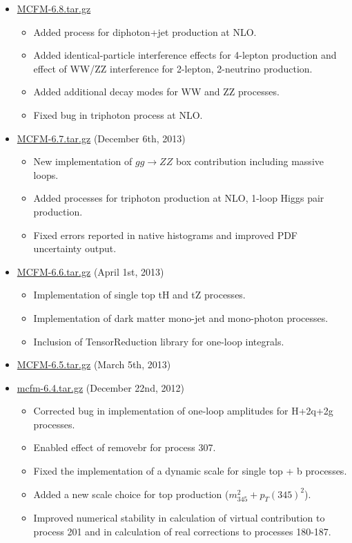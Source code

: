 \begin{itemize}
\item \href{https://mcfm.fnal.gov/downloads/MCFM-6.8.tar.gz}{MCFM-6.8.tar.gz}

\begin{itemize}
\item    Added process for diphoton+jet production at NLO.
\item    Added identical-particle interference effects for 4-lepton production and effect of WW/ZZ interference for 2-lepton, 2-neutrino production.
\item    Added additional decay modes for WW and ZZ processes.
\item    Fixed bug in triphoton process at NLO.
\end{itemize}

\item \href{https://mcfm.fnal.gov/downloads/MCFM-6.7.tar.gz}{MCFM-6.7.tar.gz} (December 6th, 2013)

\begin{itemize}
\item    New implementation of $gg \to ZZ$ box contribution including massive loops.
\item    Added processes for triphoton production at NLO, 1-loop Higgs pair production.
\item    Fixed errors reported in native histograms and improved PDF uncertainty output. 
\end{itemize}

\item \href{https://mcfm.fnal.gov/downloads/MCFM-6.6.tar.gz}{MCFM-6.6.tar.gz} (April 1st, 2013)

\begin{itemize}
\item    Implementation of single top tH and tZ processes.
\item    Implementation of dark matter mono-jet and mono-photon processes.
\item    Inclusion of TensorReduction library for one-loop integrals. 
\end{itemize}

\item \href{https://mcfm.fnal.gov/downloads/MCFM-6.5.tar.gz}{MCFM-6.5.tar.gz} (March 5th, 2013)

\item \href{https://mcfm.fnal.gov/downloads/mcfm-6.4.tar.gz}{mcfm-6.4.tar.gz} (December 22nd, 2012)

\begin{itemize}
\item    Corrected bug in implementation of one-loop amplitudes for H+2q+2g processes.
\item    Enabled effect of removebr for process 307.
\item    Fixed the implementation of a dynamic scale for single top + b processes.
\item   Added a new scale choice for top production ($m_{345}^{2}+p_{T}(345)^{2}$).
\item    Improved numerical stability in calculation of virtual contribution to process 201 and in calculation of real corrections to processes 180-187. 
\end{itemize}


\end{itemize}
